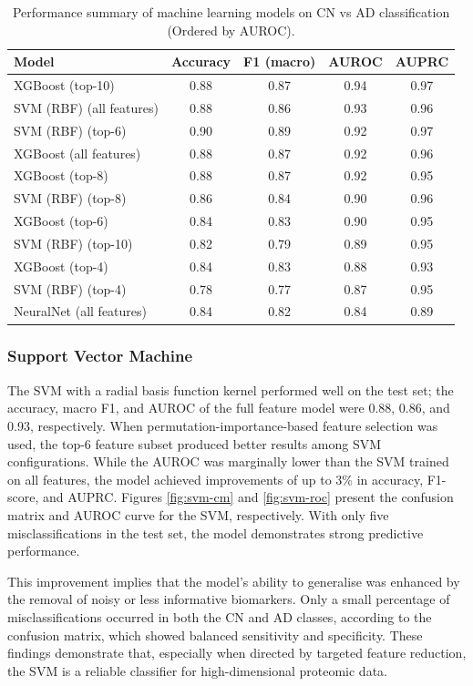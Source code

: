 \documentclass[a4paper,12pt]{article}
\begin{document}
\begin{table}[H]
\centering
\caption{Performance summary of machine learning models on CN vs AD classification (Ordered by AUROC).}
\label{tab:results-summary}
\begin{tabular}{lcccc}
\toprule
Model & Accuracy & F1 (macro) & AUROC & AUPRC \\
\midrule
XGBoost (top-10)       & 0.88 & 0.87 & 0.94 & 0.97 \\
SVM (RBF) (all features) & 0.88 & 0.86 & 0.93 & 0.96 \\
SVM (RBF) (top-6)      & 0.90 & 0.89 & 0.92 & 0.97 \\
XGBoost (all features) & 0.88 & 0.87 & 0.92 & 0.96 \\
XGBoost (top-8)        & 0.88 & 0.87 & 0.92 & 0.95 \\
SVM (RBF) (top-8)      & 0.86 & 0.84 & 0.90 & 0.96 \\
XGBoost (top-6)        & 0.84 & 0.83 & 0.90 & 0.95 \\
SVM (RBF) (top-10)     & 0.82 & 0.79 & 0.89 & 0.95 \\
XGBoost (top-4)        & 0.84 & 0.83 & 0.88 & 0.93 \\
SVM (RBF) (top-4)      & 0.78 & 0.77 & 0.87 & 0.95 \\
NeuralNet (all features) & 0.84 & 0.82 & 0.84 & 0.89 \\
\bottomrule
\end{tabular}
\end{table}


\subsubsection{Support Vector Machine}
The SVM with a radial basis function kernel performed well on the test set; the accuracy, macro F1, and AUROC of the full feature model were 0.88, 0.86, and 0.93, respectively.   When permutation-importance-based feature selection was used, the top-6 feature subset produced better results among SVM configurations. While the AUROC was marginally lower than the SVM trained on all features, the model achieved improvements of up to 3\% in accuracy, F1-score, and AUPRC. Figures \ref{fig:svm-cm} and \ref{fig:svm-roc} present the confusion matrix and AUROC curve for the SVM, respectively. With only five misclassifications in the test set, the model demonstrates strong predictive performance.

This improvement implies that the model's ability to generalise was enhanced by the removal of noisy or less informative biomarkers.  Only a small percentage of misclassifications occurred in both the CN and AD classes, according to the confusion matrix, which showed balanced sensitivity and specificity.  These findings demonstrate that, especially when directed by targeted feature reduction, the SVM is a reliable classifier for high-dimensional proteomic data.
\end{document}

